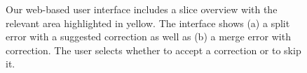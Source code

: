 
\begin{figure}[ht]
 \centering
    \hfill
	\caption{Our web-based user interface includes a slice overview with the relevant area highlighted in yellow. The interface shows (a) a split error with a suggested correction as well as (b) a merge error with correction. The user selects whether to accept a correction or to skip it.}
\label{fig:cylinderresults}
\end{figure}


